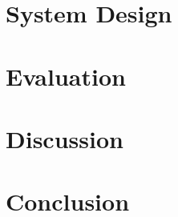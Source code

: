 \documentclass{acm_proc_article-sp}
\begin{document}
\section{System Design}

\section{Evaluation}

\section{Discussion}

\section{Conclusion}

{}


\appendix
\end{document}
